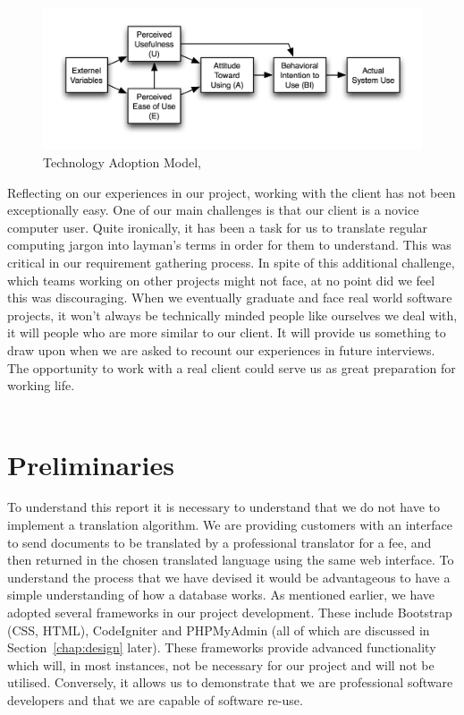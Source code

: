 \documentclass{l3proj}
\begin{document}
\begin{figure}
\begin{center}
\includegraphics{tam}
\caption{Technology Adoption Model, \cite{wik}}
\end{center}
\end{figure}

Reflecting on our experiences in our project, working with the client has not
been exceptionally easy. One of our main challenges is that our client is a
novice computer user. Quite ironically, it has been a task for us to translate
regular computing jargon into layman's terms in order for them to understand.
This was critical in our requirement gathering process. In spite of this
additional challenge, which teams working on other projects might not face, at
no point did we feel this was discouraging. When we eventually graduate and face real world software projects, it won't
always be technically minded people like ourselves we deal with, it will people
who are more similar to our client. It will provide us something to draw upon
when we are asked to recount our experiences in future interviews. The
opportunity to work with a real client could serve us as great preparation for
working life.\\
\\

\section{Preliminaries}
To understand this report it is necessary to understand that we do not have to
implement a translation algorithm. We are providing customers with an interface
to send documents to be translated by a professional translator for a fee, and
then returned in the chosen translated language using the same web interface. To
understand the process that we have devised it would be advantageous to have a
simple understanding of how a database works. As mentioned earlier, we have
adopted several frameworks in our project development. These include Bootstrap
(CSS, HTML), CodeIgniter and PHPMyAdmin (all of which are discussed in
Section~\ref{chap:design} later). These frameworks provide advanced
functionality which will, in most instances, not be necessary for our project
and will not be utilised. Conversely, it allows us to demonstrate that we are
professional software developers and that we are capable of software re-use.
\end{document}
